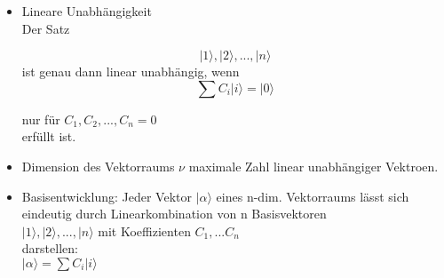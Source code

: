 \documentclass[10pt,article,colorback,accentcolor=tud9d]{scrartcl}
\begin{document}
\begin{itemize}
\item Lineare Unabhängigkeit\\
Der Satz
 
\begin{equation} \nonumber
{\left|1\rangle \right.,\left|2\rangle \right.,...,\left|n\rangle \right.}
\end{equation}
ist genau dann linear unabhängig, wenn
\begin{equation}
\sum {C}_i \left|i\rangle \right. = \left|0\rangle \right.
\end{equation}
 
nur für ${C}_1, {C}_2,...,{C}_n=0$\\
erfüllt ist.
\item Dimension des Vektorraums $\nu$ maximale Zahl linear unabhängiger 
Vektroen. 
\item Basisentwicklung: Jeder Vektor $\left|\alpha\rangle \right.$ eines n-dim. 
Vektorraums lässt sich eindeutig durch Linearkombination von n Basisvektoren \\
${\left|1\rangle \right.,\left|2\rangle \right.,...,\left|n\rangle \right.}$ mit Koeffizienten ${C}
_1,...{C}_n$\\
darstellen:\\
$\left|\alpha\rangle \right. = \sum {C}_i \left|i\rangle \right.$
\end{itemize}
\end{document}
